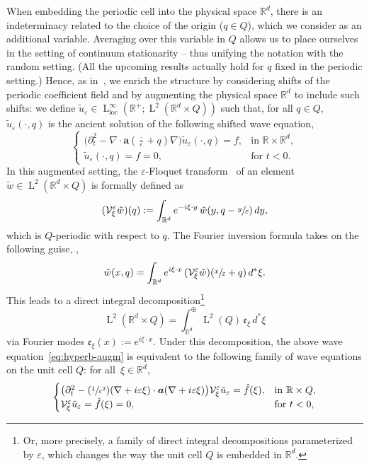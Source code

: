 \documentclass[JEP,XML,SOM,Unicode,published]{cedram}
\newcommand{\Psfrac}[2]{(\sfrac{#1}{#2})}
\theoremstyle{plain}
\theoremstyle{definition}
\numberwithin{equation}{section}
\newcommand{\e}{\varepsilon}
\newcommand{\Vc}{\mathcal V}
\newcommand{\R}{\mathbb R}
\newcommand{\loc}{{\operatorname{loc}}}
\newcommand{\Aa}{\boldsymbol a}
\newcommand{\Ld}{\operatorname{L}}
\begin{document}
{When embedding the periodic cell into the physical space $\R^d$, there is an indeterminacy related to the choice of the origin ($q \in Q$), which we consider as an additional variable. Averaging over this variable in $Q$ allows us to place ourselves in the setting of continuum stationarity -- thus unifying the notation with the random setting. (All the upcoming results actually hold for $q$ fixed in the periodic setting.)
Hence, as in~\cite{BG,DGS,DS1}, we enrich} the structure by considering shifts of the periodic coefficient field and by augmenting the physical space $\R^d$ to include such shifts: we define $\tilde u_\e\in\Ld^\infty_\loc(\R^+;\Ld^2(\R^d\times Q))$ such that, for all $q\in Q$, $\tilde u_\e(\cdot,q)$ is the ancient solution of the following shifted wave equation,
\begin{equation}\label{eq:hyperb-augm}
\begin{cases}
\big(\partial_t^2-\nabla\cdot\Aa(\tfrac\cdot\e+q)\nabla\big)\tilde u_\e(\cdot,q)=f,&\text{in $\R\times\R^d$},\\
\tilde u_\e(\cdot,q)=f=0,&\text{for $t<0$}.
\end{cases}
\end{equation}
In this augmented setting, the $\e$-Floquet transform~\cite{DGS,DS1} of an element $\tilde w\!\in\!\Ld^2(\R^d\!\times\! Q)$ is formally defined as
\[(\Vc_\xi^\e\tilde w)(q):=\int_{\R^d}e^{-i\xi\cdot y}\,\tilde w(y,q-\sfrac y\e)\,dy,\]
which is $Q$-periodic with respect to $q$. The Fourier inversion formula takes on the following guise, \cf \cite[Lem.\,2.2]{DGS},
\begin{equation}\label{eq:invert-Floquet}
\tilde w(x,q)=\int_{\R^d}e^{i\xi\cdot x}\,(\Vc_\xi^\e \tilde w)(\sfrac x\e+q)\,d^* \xi.
\end{equation}
This leads to a direct integral decomposition\footnote{Or, more precisely, a family of direct integral decompositions parameterized by $\e$, which changes the way the unit cell $Q$ is embedded in $\R^d$.}
\[\Ld^2(\R^d\times Q)=\int_{\R^d}^\oplus\Ld^2( Q)\,\mathfrak e_\xi\,d^*\xi\]
via Fourier modes $\mathfrak e_\xi(x):=e^{i\xi\cdot x}$.
Under this decomposition, the above wave equation~\eqref{eq:hyperb-augm} is equivalent to the following family of wave equations on the unit cell $Q${:} for all~$\xi\in\R^d$,
\begin{equation*}
\begin{cases}
\big(\partial_t^2-\Psfrac1{\e^2}(\nabla+i\e\xi)\cdot\Aa(\nabla+i\e\xi)\big)\Vc_\xi^\e\tilde u_\e=\hat f(\xi),&\text{in $\R\times Q$},\\
\Vc_\xi^\e\tilde u_\e=\hat f(\xi)=0,&\text{for $t<0$},
\end{cases}
\end{equation*}
\end{document}
